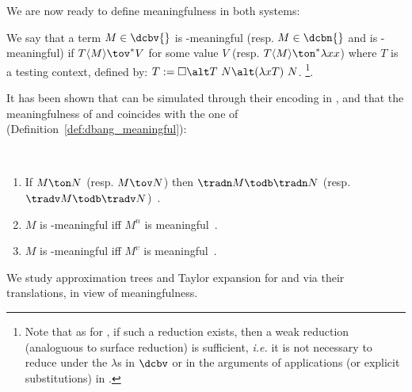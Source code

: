 We are now ready to define meaningfulness in both systems:
\begin{definition}
	\label{def:dcbn-dcbv-meaningfulness}
	We say that a term $M \in \dcbv{}$ is \dcbv-meaningful (resp.
	$M\in\dcbn{}$ and is \dcbn-meaningful) if $T\langle M \rangle
	\tov^* V$ for some value $V$ (resp. $T\langle M \rangle \ton^*
	\lambda xx$) where $T$ is a testing context, defined by: $T :=
	\square \alt T~N \alt (\lambda x T)~N$.
	\footnote{
		Note that as for \dbang, if such a reduction exists, then 
		a weak reduction (analoguous to surface
		reduction) is sufficient, \emph{i.e.} it is not necessary to reduce under
		the $\lambda$s in $\dcbv$ or in the arguments of applications (or explicit
		substitutions) in \dcbn.
	}.
\end{definition}
\begin{example}
\end{example}
It has been shown that \dcbn{} \dcbv{} can be simulated through their encoding
in \dbang{}, and that the meaningfulness of \dcbv{} and \dcbn{} coincides with
the one of \dbang{} (Definition~\ref{def:dbang_meaningful}):


\begin{theorem}~
	\label{thm:trad_meaningfulness}
	\begin{enumerate}
		\item If $M \ton N$ (resp. $M\tov N$) then $\tradn M \todb \tradn N$
		(resp. $\tradv M\todb\tradv N$)~\cite[Lemma 4.6]{bucciarelli2023bang}.
		\item $M$ is \dcbn{}-meaningful iff $M^n$ is meaningful~\cite[Theorem 25]{kag24}.
		\item $M$ is \dcbv{}-meaningful iff $M^v$ is meaningful~\cite[Theorem 30]{kag24}.
	\end{enumerate}
\end{theorem}

We study approximation trees and Taylor expansion for \dcbv{} and \dcbn{} via their translations, in view of meaningfulness.

